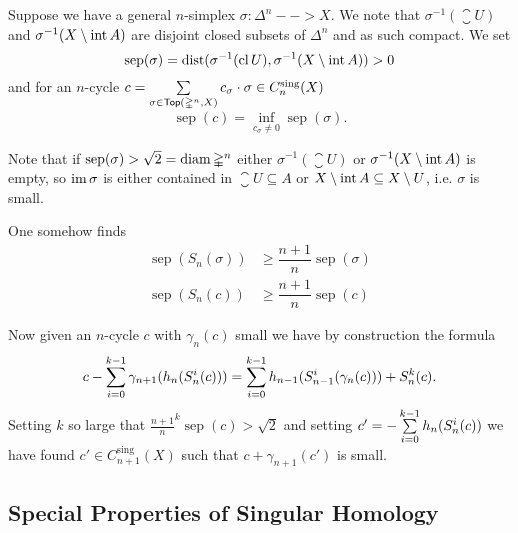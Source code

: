 \begin{sketch}
		Suppose we have a general $n$-simplex $\sigma:\mathbb{\Delta}^n --> X$. We note that $\sigma^{-1}(\closure U)$ and $\sigma^{-1}(X \setminus \operatorname{int} A)$ are disjoint closed subsets of $\mathbb{\Delta}^n$ and as such compact. We set
		\begin{equation*}
			\operatorname{sep}(\sigma) = \operatorname{dist}(\sigma^{-1}(\operatorname{cl} U),\sigma^{-1}(X \setminus \operatorname{int} A)) > 0
		\end{equation*}
		and for an $n$-cycle $c = \sum \limits_{\sigma \in \textsf{Top}(\mathbb{\Delta}^n,X)}c_\sigma \cdot \sigma \in C_n^\text{sing}(X)$
		\begin{equation*}
			\operatorname{sep}(c) = \inf \limits_{c_\sigma \neq 0} \operatorname{sep}(\sigma).
		\end{equation*}

		Note that if $\operatorname{sep}(\sigma) > \sqrt{2} = \operatorname{diam} \mathbb{\Delta}^n$ either $\sigma^{-1}(\closure U)$ or $\sigma^{-1}(X \setminus \operatorname{int} A)$ is empty, so $\operatorname{im} \sigma$ is either contained in $\closure U \subseteq A$ or $X \setminus \operatorname{int} A \subseteq X \setminus U$, i.e. $\sigma$ is small.

		One somehow finds
		\begin{align*}
			\operatorname{sep}(S_n(\sigma)) &\geq \dfrac{n+1}{n}\operatorname{sep}(\sigma)\\
			\operatorname{sep}(S_n(c)) &\geq \dfrac{n+1}{n}\operatorname{sep}(c)
		\end{align*}

		Now given an $n$-cycle $c$ with $\gamma_n(c)$ small we have by construction the formula
		\begin{equation*}
			c - \sum \limits_{i=0}^{k-1} \gamma_{n+1}(h_n(S_n^i(c))) = \sum \limits_{i=0}^{k-1} h_{n-1}(S_{n-1}^i(\gamma_n(c))) + S_n^k(c).
		\end{equation*}
		Setting $k$ so large that $\frac{n+1}{n}^k \operatorname{sep}(c) > \sqrt{2}$ and setting $c' = -\sum \limits_{i=0}^{k-1}h_n(S_n^i(c))$ we have found $c' \in C_{n+1}^\text{sing}(X)$ such that $c+\gamma_{n+1}(c')$ is small.
	\end{sketch}



	\newpage
	\subsection{Special Properties of Singular Homology}

